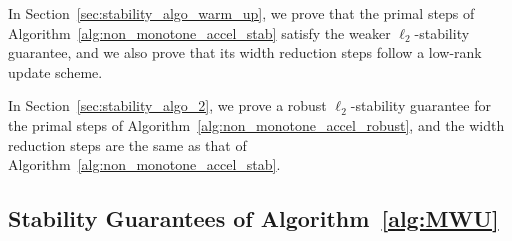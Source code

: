 \documentclass[11pt]{article}
\begin{document}
In Section~\ref{sec:stability_algo_warm_up}, we prove that the primal steps of Algorithm~\ref{alg:non_monotone_accel_stab} satisfy the weaker $\ell_2$-stability guarantee, and we also prove that its width reduction steps follow a low-rank update scheme.

In Section~\ref{sec:stability_algo_2}, we prove a robust $\ell_2$-stability guarantee for the primal steps of Algorithm~\ref{alg:non_monotone_accel_robust}, and the width reduction steps are the same as that of Algorithm~\ref{alg:non_monotone_accel_stab}.


\subsection{Stability Guarantees of Algorithm~\ref{alg:MWU}}\label{sec:stability_algo_1}




\MonotonePrimal*
\end{document}
